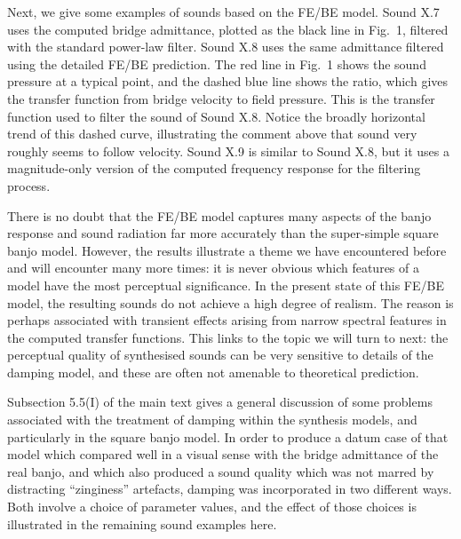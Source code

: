   Next, we give some examples of sounds based on the FE/BE model. Sound X.7 
  uses the computed bridge admittance, plotted as the black line in Fig.\ 1, 
  filtered with the standard power-law filter. Sound X.8 uses the same 
  admittance filtered using the detailed FE/BE prediction. The red line in 
  Fig.\ 1 shows the sound pressure at a typical point, and the dashed blue line 
  shows the ratio, which gives the transfer function from bridge velocity to 
  field pressure. This is the transfer function used to filter the sound of 
  Sound X.8. Notice the broadly horizontal trend of this dashed curve, 
  illustrating the comment above that sound very roughly seems to follow 
  velocity. Sound X.9 is similar to Sound X.8, but it uses a magnitude-only 
  version of the computed frequency response for the filtering process. 


  There is no doubt that the FE/BE model captures many aspects of the banjo 
  response and sound radiation far more accurately than the super-simple square 
  banjo model. However, the results illustrate a theme we have encountered 
  before and will encounter many more times: it is never obvious which features 
  of a model have the most perceptual significance. In the present state of 
  this FE/BE model, the resulting sounds do not achieve a high degree of 
  realism. The reason is perhaps associated with transient effects arising from 
  narrow spectral features in the computed transfer functions. This links to 
  the topic we will turn to next: the perceptual quality of synthesised sounds 
  can be very sensitive to details of the damping model, and these are often 
  not amenable to theoretical prediction. 

  Subsection 5.5(I) of the main text gives a general discussion of some 
  problems associated with the treatment of damping within the synthesis 
  models, and particularly in the square banjo model. In order to produce a 
  datum case of that model which compared well in a visual sense with the 
  bridge admittance of the real banjo, and which also produced a sound quality 
  which was not marred by distracting ``zinginess'' artefacts, damping was 
  incorporated in two different ways. Both involve a choice of parameter 
  values, and the effect of those choices is illustrated in the remaining sound 
  examples here. 

